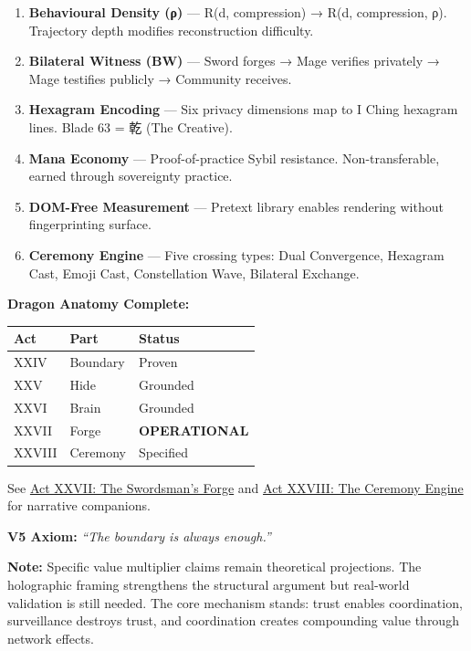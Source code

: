 \documentclass[
  11pt,
]{article}
\newcounter{none} %
\begin{document}
\begin{enumerate}
\def\labelenumi{\arabic{enumi}.}
\item
  \textbf{Behavioural Density (ρ)} --- R(d, compression) → R(d,
  compression, ρ). Trajectory depth modifies reconstruction difficulty.
\item
  \textbf{Bilateral Witness (BW)} --- Sword forges → Mage verifies
  privately → Mage testifies publicly → Community receives.
\item
  \textbf{Hexagram Encoding} --- Six privacy dimensions map to I Ching
  hexagram lines. Blade 63 = 乾 (The Creative).
\item
  \textbf{Mana Economy} --- Proof-of-practice Sybil resistance.
  Non-transferable, earned through sovereignty practice.
\item
  \textbf{DOM-Free Measurement} --- Pretext library enables rendering
  without fingerprinting surface.
\item
  \textbf{Ceremony Engine} --- Five crossing types: Dual Convergence,
  Hexagram Cast, Emoji Cast, Constellation Wave, Bilateral Exchange.
\end{enumerate}

\textbf{Dragon Anatomy Complete:}

{\def\LTcaptype{none} %
\begin{longtable}[]{@{}lll@{}}
\toprule\noalign{}
Act & Part & Status \\
\midrule\noalign{}
\endhead
\bottomrule\noalign{}
\endlastfoot
XXIV & Boundary & Proven \\
XXV & Hide & Grounded \\
XXVI & Brain & Grounded \\
XXVII & Forge & \textbf{OPERATIONAL} \\
XXVIII & Ceremony & Specified \\
\end{longtable}
}

See \href{archive/act-xxvii-the-swordsmans-forge.md}{Act XXVII: The
Swordsman's Forge} and
\href{archive/act-xxviii-the-ceremony-engine.md}{Act XXVIII: The
Ceremony Engine} for narrative companions.

\textbf{V5 Axiom:} \emph{``The boundary is always enough.''}

\textbf{Note:} Specific value multiplier claims remain theoretical
projections. The holographic framing strengthens the structural argument
but real-world validation is still needed. The core mechanism stands:
trust enables coordination, surveillance destroys trust, and
coordination creates compounding value through network effects.
\end{document}
